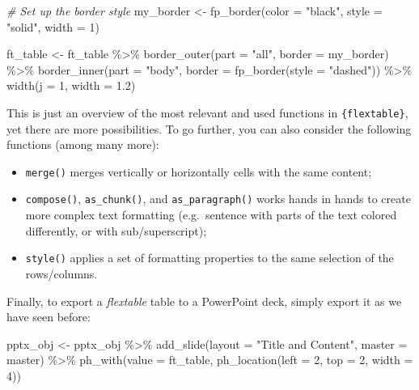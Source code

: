 \documentclass[
]{krantz}
\makeatletter
\newenvironment{Shaded}{\begin{snugshade}}{\end{snugshade}}
\newcommand{\AttributeTok}[1]{\textcolor[rgb]{0.61,0.61,0.61}{#1}}
\newcommand{\CommentTok}[1]{\textcolor[rgb]{0.37,0.37,0.37}{\textit{#1}}}
\newcommand{\DecValTok}[1]{\textcolor[rgb]{0.06,0.06,0.06}{#1}}
\newcommand{\FloatTok}[1]{\textcolor[rgb]{0.06,0.06,0.06}{#1}}
\newcommand{\FunctionTok}[1]{\textcolor[rgb]{0,0,0}{#1}}
\newcommand{\NormalTok}[1]{#1}
\newcommand{\OtherTok}[1]{\textcolor[rgb]{0.37,0.37,0.37}{#1}}
\newcommand{\SpecialCharTok}[1]{\textcolor[rgb]{0,0,0}{#1}}
\newcommand{\StringTok}[1]{\textcolor[rgb]{0.5,0.5,0.5}{#1}}
\providecommand{\tightlist}{%
  \setlength{\itemsep}{0pt}\setlength{\parskip}{0pt}}
\newenvironment{kframe}{%
\medskip{}
\setlength{\fboxsep}{.8em}
 \def\at@end@of@kframe{}%
 \ifinner\ifhmode%
  \def\at@end@of@kframe{\end{minipage}}%
  \begin{minipage}{\columnwidth}%
 \fi\fi%
 \def\FrameCommand##1{\hskip\@totalleftmargin \hskip-\fboxsep
 \colorbox{shadecolor}{##1}\hskip-\fboxsep
     \hskip-\linewidth \hskip-\@totalleftmargin \hskip\columnwidth}%
 \MakeFramed {\advance\hsize-\width
   \@totalleftmargin\z@ \linewidth\hsize
   \@setminipage}}%
 {\par\unskip\endMakeFramed%
 \at@end@of@kframe}
\renewenvironment{Shaded}{\begin{kframe}}{\end{kframe}}
\makeatother
\begin{document}
\begin{Shaded}
\begin{Highlighting}[]
\CommentTok{\# Set up the border style}
\NormalTok{my\_border }\OtherTok{\textless{}{-}} \FunctionTok{fp\_border}\NormalTok{(}\AttributeTok{color =} \StringTok{"black"}\NormalTok{, }\AttributeTok{style =} \StringTok{"solid"}\NormalTok{, }\AttributeTok{width =} \DecValTok{1}\NormalTok{)}

\NormalTok{ft\_table }\OtherTok{\textless{}{-}}\NormalTok{ ft\_table }\SpecialCharTok{\%\textgreater{}\%}
  \FunctionTok{border\_outer}\NormalTok{(}\AttributeTok{part =} \StringTok{"all"}\NormalTok{, }\AttributeTok{border =}\NormalTok{ my\_border) }\SpecialCharTok{\%\textgreater{}\%}
  \FunctionTok{border\_inner}\NormalTok{(}\AttributeTok{part =} \StringTok{"body"}\NormalTok{, }\AttributeTok{border =} \FunctionTok{fp\_border}\NormalTok{(}\AttributeTok{style =} \StringTok{"dashed"}\NormalTok{)) }\SpecialCharTok{\%\textgreater{}\%} 
  \FunctionTok{width}\NormalTok{(}\AttributeTok{j =} \DecValTok{1}\NormalTok{, }\AttributeTok{width =} \FloatTok{1.2}\NormalTok{)}
\end{Highlighting}
\end{Shaded}

This is just an overview of the most relevant and used functions in \texttt{\{flextable\}}, yet there are more possibilities.
To go further, you can also consider the following functions (among many more):

\begin{itemize}
\tightlist
\item
  \texttt{merge()} merges vertically or horizontally cells with the same content;
\item
  \texttt{compose()}, \texttt{as\_chunk()}, and \texttt{as\_paragraph()} works hands in hands to create more complex text formatting (e.g.~sentence with parts of the text colored differently, or with sub/superscript);
\item
  \texttt{style()} applies a set of formatting properties to the same selection of the rows/columns.
\end{itemize}

Finally, to export a \emph{flextable} table to a PowerPoint deck, simply export it as we have seen before:

\begin{Shaded}
\begin{Highlighting}[]
\NormalTok{pptx\_obj }\OtherTok{\textless{}{-}}\NormalTok{ pptx\_obj }\SpecialCharTok{\%\textgreater{}\%}
  \FunctionTok{add\_slide}\NormalTok{(}\AttributeTok{layout =} \StringTok{"Title and Content"}\NormalTok{, }\AttributeTok{master =}\NormalTok{ master) }\SpecialCharTok{\%\textgreater{}\%}
  \FunctionTok{ph\_with}\NormalTok{(}\AttributeTok{value =}\NormalTok{ ft\_table, }
          \FunctionTok{ph\_location}\NormalTok{(}\AttributeTok{left =} \DecValTok{2}\NormalTok{, }\AttributeTok{top =} \DecValTok{2}\NormalTok{, }\AttributeTok{width =} \DecValTok{4}\NormalTok{))}
\end{Highlighting}
\end{Shaded}
\end{document}
